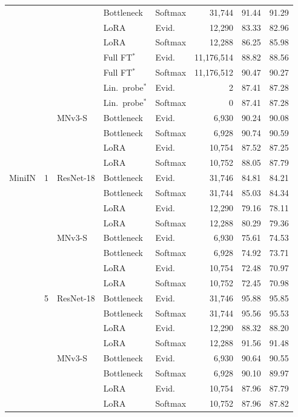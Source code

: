 \begin{longtable}{@{}lllllrrr@{}}
 &  &  & Bottleneck & Softmax & 31,744 & 91.44 & 91.29 \\
 &  &  & LoRA & Evid. & 12,290 & 83.33 & 82.96 \\
 &  &  & LoRA & Softmax & 12,288 & 86.25 & 85.98 \\
 &  &  & Full FT$^\ast$ & Evid. & 11,176,514 & 88.82 & 88.56 \\
 &  &  & Full FT$^\ast$ & Softmax & 11,176,512 & 90.47 & 90.27 \\
 &  &  & Lin.\ probe$^\ast$ & Evid. & 2 & 87.41 & 87.28 \\
 &  &  & Lin.\ probe$^\ast$ & Softmax & 0 & 87.41 & 87.28 \\
 &  & MNv3-S & Bottleneck & Evid. & 6,930 & 90.24 & 90.08 \\
 &  &  & Bottleneck & Softmax & 6,928 & 90.74 & 90.59 \\
 &  &  & LoRA & Evid. & 10,754 & 87.52 & 87.25 \\
 &  &  & LoRA & Softmax & 10,752 & 88.05 & 87.79 \\
MiniIN & 1 & ResNet-18 & Bottleneck & Evid. & 31,746 & 84.81 & 84.21 \\
 &  &  & Bottleneck & Softmax & 31,744 & 85.03 & 84.34 \\
 &  &  & LoRA & Evid. & 12,290 & 79.16 & 78.11 \\
 &  &  & LoRA & Softmax & 12,288 & 80.29 & 79.36 \\
 &  & MNv3-S & Bottleneck & Evid. & 6,930 & 75.61 & 74.53 \\
 &  &  & Bottleneck & Softmax & 6,928 & 74.92 & 73.71 \\
 &  &  & LoRA & Evid. & 10,754 & 72.48 & 70.97 \\
 &  &  & LoRA & Softmax & 10,752 & 72.45 & 70.98 \\
 & 5 & ResNet-18 & Bottleneck & Evid. & 31,746 & 95.88 & 95.85 \\
 &  &  & Bottleneck & Softmax & 31,744 & 95.56 & 95.53 \\
 &  &  & LoRA & Evid. & 12,290 & 88.32 & 88.20 \\
 &  &  & LoRA & Softmax & 12,288 & 91.56 & 91.48 \\
 &  & MNv3-S & Bottleneck & Evid. & 6,930 & 90.64 & 90.55 \\
 &  &  & Bottleneck & Softmax & 6,928 & 90.10 & 89.97 \\
 &  &  & LoRA & Evid. & 10,754 & 87.96 & 87.79 \\
 &  &  & LoRA & Softmax & 10,752 & 87.96 & 87.82 \\
\end{longtable}
\endgroup


